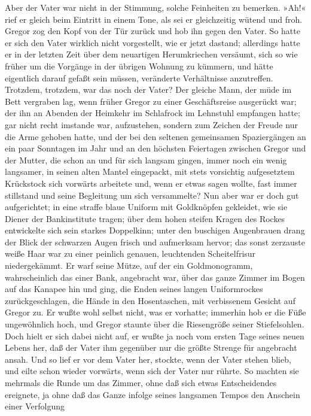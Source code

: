 Aber der Vater war nicht in der Stimmung, solche Feinheiten zu bemerken.
»Ah!« rief er gleich beim Eintritt in einem Tone, als sei er
gleichzeitig wütend und froh. Gregor zog den Kopf von der Tür zurück und
hob ihn gegen den Vater. So hatte er sich den Vater wirklich nicht
vorgestellt, wie er jetzt dastand; allerdings hatte er in der letzten
Zeit über dem neuartigen Herumkriechen versäumt, sich so wie früher um
die Vorgänge in der übrigen Wohnung zu kümmern, und hätte eigentlich
darauf gefaßt sein müssen, veränderte Verhältnisse anzutreffen.
Trotzdem, trotzdem, war das noch der Vater? Der gleiche Mann, der müde
im Bett vergraben lag, wenn früher Gregor zu einer Geschäftsreise
ausgerückt war; der ihn an Abenden der Heimkehr im Schlafrock im
Lehnstuhl empfangen hatte; gar nicht recht imstande war, aufzustehen,
sondern zum Zeichen der Freude nur die Arme gehoben hatte, und der bei
den seltenen gemeinsamen Spaziergängen an ein paar Sonntagen im Jahr und
an den höchsten Feiertagen zwischen Gregor und der Mutter, die schon an
und für sich langsam gingen, immer noch ein wenig langsamer, in seinen
alten Mantel eingepackt, mit stets vorsichtig aufgesetztem Krückstock
sich vorwärts arbeitete und, wenn er etwas sagen wollte, fast immer
stillstand und seine Begleitung um sich versammelte? Nun aber war er
doch gut aufgerichtet; in eine straffe blaue Uniform mit Goldknöpfen
gekleidet, wie sie Diener der Bankinstitute tragen; über dem hohen
steifen Kragen des Rockes entwickelte sich sein starkes Doppelkinn;
unter den buschigen Augenbrauen drang der Blick der schwarzen Augen
frisch und aufmerksam hervor; das sonst zerzauste weiße Haar war zu
einer peinlich genauen, leuchtenden Scheitelfrisur niedergekämmt. Er
warf seine Mütze, auf der ein Goldmonogramm, wahrscheinlich das einer
Bank, angebracht war, über das ganze Zimmer im Bogen auf das Kanapee hin
und ging, die Enden seines langen Uniformrockes zurückgeschlagen, die
Hände in den Hosentaschen, mit verbissenem Gesicht auf Gregor zu. Er
wußte wohl selbst nicht, was er vorhatte; immerhin hob er die Füße
ungewöhnlich hoch, und Gregor staunte über die Riesengröße seiner
Stiefelsohlen. Doch hielt er sich dabei nicht auf, er wußte ja noch vom
ersten Tage seines neuen Lebens her, daß der Vater ihm gegenüber nur die
größte Strenge für angebracht ansah. Und so lief er vor dem Vater her,
stockte, wenn der Vater stehen blieb, und eilte schon wieder vorwärts,
wenn sich der Vater nur rührte. So machten sie mehrmals die Runde um das
Zimmer, ohne daß sich etwas Entscheidendes ereignete, ja ohne daß das
Ganze infolge seines langsamen Tempos den Anschein einer Verfolgung
